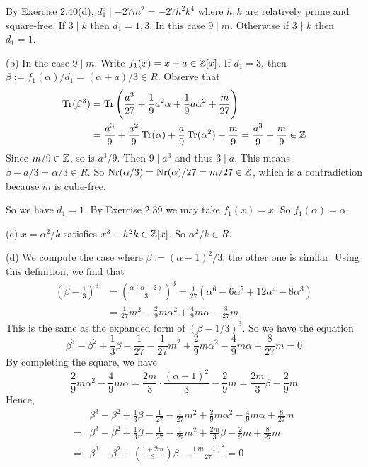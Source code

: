 \documentclass[../Marcus.tex]{subfiles}
\begin{document}
By Exercise 2.40(d), $d_1^6\mid -27m^2=-27h^2k^4$ where $h,k$ are relatively prime and square-free. If $3\mid k$ then $d_1=1,3$. In this case $9\mid m$. Otherwise if $3\nmid k$ then $d_1=1$.

(b) In the case $9\mid m$. Write $f_1(x)=x+a\in\mathbb{Z}[x]$. If $d_1=3$, then $\beta:=f_1(\alpha)/d_1=(\alpha+a)/3\in R$. Observe that
\begin{align*}
    \operatorname{Tr}(\beta^3) &= \operatorname{Tr}\left(\frac{a^3}{27}+\frac{1}{9}a^2\alpha+\frac{1}{9}a\alpha^2+\frac{m}{27}\right) \\ 
    &= \frac{a^3}{9}+\frac{a^2}{9}\operatorname{Tr}(\alpha)+\frac{a}{9}\operatorname{Tr}(\alpha^2)+\frac{m}{9} = \frac{a^3}{9}+\frac{m}{9} \in\mathbb{Z}
\end{align*}
Since $m/9\in\mathbb{Z}$, so is $a^3/9$. Then $9\mid a^3$ and thus $3\mid a$. This means $\beta-a/3=\alpha/3\in R$. So $\operatorname{Nr}(\alpha/3)=\operatorname{Nr}(\alpha)/27=m/27\in\mathbb{Z}$, which is a contradiction because $m$ is cube-free.

So we have $d_1=1$. By Exercise 2.39 we may take $f_1(x)=x$. So $f_1(\alpha)=\alpha$.

(c) $x=\alpha^2/k$ satisfies $x^3-h^2k\in\mathbb{Z}[x]$. So $\alpha^2/k\in R$.

(d) We compute the case where $\beta:=(\alpha-1)^2/3$, the other one is similar. Using this definition, we find that
\begin{align*}
    \left(\beta-\frac{1}{3}\right)^3 &= \left(\frac{\alpha(\alpha-2)}{3}\right)^3 = \frac{1}{27}(\alpha^6-6\alpha^5+12\alpha^4-8\alpha^3) \\
    &= \frac{1}{27}m^2-\frac{2}{9}m\alpha^2+\frac{4}{9}m\alpha-\frac{8}{27}m
\end{align*}
This is the same as the expanded form of $(\beta-1/3)^3$. So we have the equation $$\beta^3-\beta^2+\frac{1}{3}\beta-\frac{1}{27}-\frac{1}{27}m^2+\frac{2}{9}m\alpha^2-\frac{4}{9}m\alpha+\frac{8}{27}m=0$$
By completing the square, we have $$\frac{2}{9}m\alpha^2-\frac{4}{9}m\alpha = \frac{2m}{3}\cdot\frac{(\alpha-1)^2}{3}-\frac{2}{9}m = \frac{2m}{3}\beta-\frac{2}{9}m$$
Hence,
\begin{align*}
    &\beta^3-\beta^2+\frac{1}{3}\beta-\frac{1}{27}-\frac{1}{27}m^2+\frac{2}{9}m\alpha^2-\frac{4}{9}m\alpha+\frac{8}{27}m \\
    ={} &\beta^3-\beta^2+\frac{1}{3}\beta-\frac{1}{27}-\frac{1}{27}m^2+\frac{2m}{3}\beta-\frac{2}{9}m+\frac{8}{27}m \\
    ={} &\beta^3-\beta^2+\left(\frac{1+2m}{3}\right)\beta-\frac{(m-1)^2}{27} = 0
\end{align*}
\end{document}

